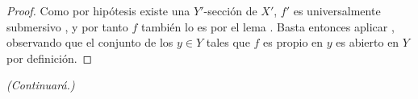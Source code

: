 \begin{proof}
Como por hipótesis existe una $Y'$-sección de $X'$, $f'$ es universalmente submersivo , y por tanto $f$ también lo es por el lema .
Basta entonces aplicar , observando que el conjunto de los $y\in Y$ tales que $f$ es propio en $y$ es abierto en $Y$ por definición.
\end{proof}

\begin{center}
\emph{(Continuará.)}
\end{center}
